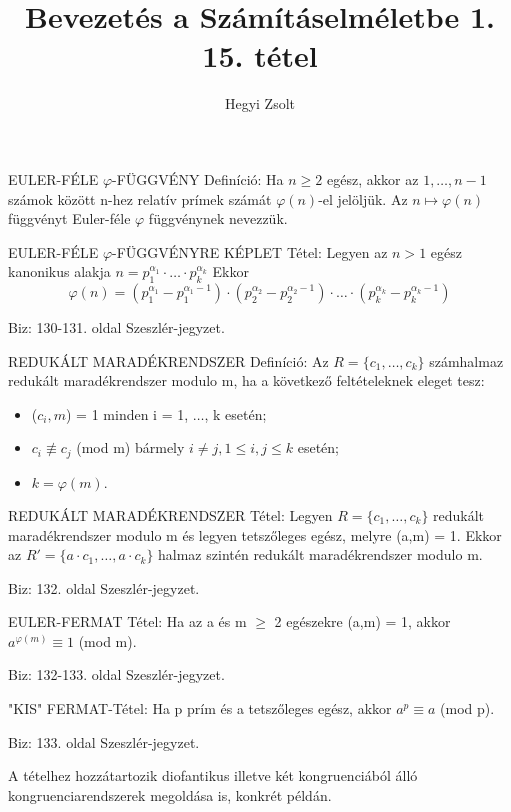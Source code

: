 \documentclass[]{article}
\title{Bevezetés a Számításelméletbe 1.\\{\large 15. tétel}}
\author{Hegyi Zsolt}
\begin{document}
\maketitle{}
\begin{shaded}
EULER-FÉLE $\varphi$-FÜGGVÉNY Definíció: Ha $n \geq 2$ egész, akkor az $1,\ldots,n-1$ számok között n-hez relatív prímek számát $\varphi(n)$-el jelöljük. Az $n\mapsto\varphi(n)$ függvényt Euler-féle $\varphi$ függvénynek nevezzük.
\end{shaded}
\begin{framed}
EULER-FÉLE $\varphi$-FÜGGVÉNYRE KÉPLET Tétel: Legyen az $n > 1$ egész kanonikus alakja $n = p_1^{\alpha_1} \cdot \ldots \cdot p_k^{\alpha_k}$ Ekkor $$\varphi(n) = \left(p_1^{\alpha_1} - p_1^{\alpha_1-1}\right) \cdot \left(p_2^{\alpha_2} - p_2^{\alpha_2-1}\right) \cdot \ldots \cdot
\left(p_k^{\alpha_k} - p_k^{\alpha_k-1}\right)$$
\end{framed}
\begin{leftbar}
Biz: 130-131. oldal Szeszlér-jegyzet.
\end{leftbar}
\begin{shaded}
REDUKÁLT MARADÉKRENDSZER Definíció: Az $R = \{c_1, \ldots, c_k\}$ számhalmaz redukált maradékrendszer modulo m, ha a következő feltételeknek eleget tesz:
\begin{itemize}
\item ($c_i, m$) = 1 minden i = 1, $\ldots$, k esetén;
\item $c_i \not \equiv c_j$ (mod m) bármely $i \neq j, 1 \leq i, j \leq k$ esetén;
\item $k = \varphi(m).$
\end{itemize}
\end{shaded}
\begin{framed}
REDUKÁLT MARADÉKRENDSZER Tétel: Legyen $R = \{c_1, \ldots, c_k\}$ redukált maradékrendszer modulo m és legyen tetszőleges egész, melyre (a,m) = 1. Ekkor az $R' = \{a\cdot c_1, \ldots, a \cdot c_k\}$ halmaz szintén redukált maradékrendszer modulo m.
\end{framed}
\begin{leftbar}
Biz: 132. oldal Szeszlér-jegyzet.
\end{leftbar}
\begin{framed}
EULER-FERMAT Tétel: Ha az a és m $\geq$ 2 egészekre (a,m) = 1, akkor $a^{\varphi(m)} \equiv 1$ (mod m).
\end{framed}
\begin{leftbar}
Biz: 132-133. oldal Szeszlér-jegyzet.
\end{leftbar}
\begin{framed}
"KIS" FERMAT-Tétel: Ha p prím és a tetszőleges egész, akkor $a^p \equiv a$ (mod p).
\end{framed}
\begin{leftbar}
Biz: 133. oldal Szeszlér-jegyzet.
\end{leftbar}
A tételhez hozzátartozik diofantikus illetve két kongruenciából álló kongruenciarendszerek megoldása is, konkrét példán.
\end{document}
